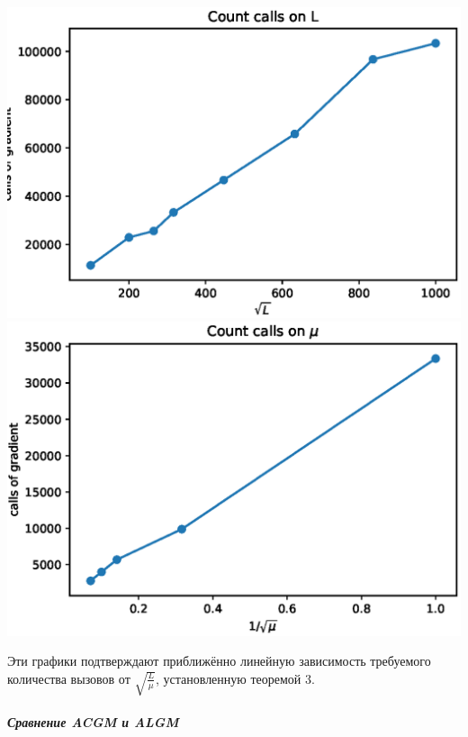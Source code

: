 \documentclass{crm-article}
\begin{document}
\noindent
\includegraphics[scale=0.5]{plots/algm_l.eps}
\includegraphics[scale=0.5]{plots/algm_r.eps}

Эти графики подтверждают приближённо линейную зависимость требуемого количества вызовов от $\sqrt{\frac{L}{\mu}}$, установленную теоремой 3.

\subparagraph{Сравнение ACGM и ALGM}
\end{document}
